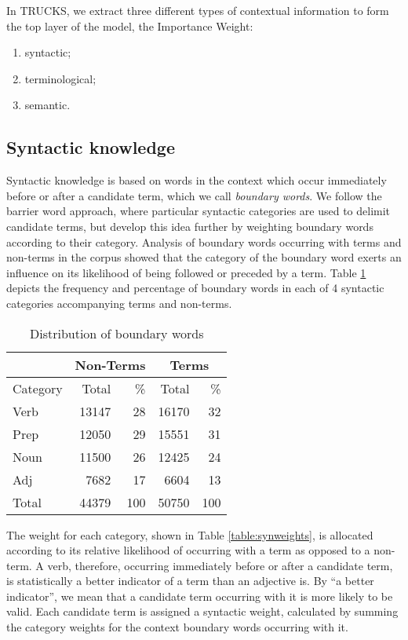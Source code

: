 In TRUCKS, we extract three different types of contextual information
to form the top layer of the model, the Importance Weight:
\begin{enumerate}
\item syntactic;
\item terminological;
\item semantic.
\end{enumerate}

\subsection{Syntactic knowledge}
Syntactic knowledge is based on words
in the context which occur immediately before or after a candidate
term, which we call {\it boundary words}. We follow the barrier
word approach,
where particular syntactic categories are used to delimit candidate
terms, but develop this idea further by weighting boundary words
according to their category. Analysis of boundary words occurring with
terms and non-terms in the corpus showed that the category of the
boundary word exerts an influence on its likelihood of being followed or
preceded by a term. Table \ref{table:syndistrib} depicts the frequency and
percentage of boundary words in each of 4 syntactic categories accompanying terms
and non-terms. 

\begin{table}
\begin{center}
\begin{tabular}{|l|r|r|r|r|}
\hline
 & \multicolumn{2}{|c|}{Non-Terms} & \multicolumn{2}{c|}{Terms}\\
\hline
Category & Total & \% & Total & \%\\
\hline
Verb & 13147 & 28 & 16170 & 32\\ 
Prep & 12050 & 29 & 15551 & 31\\ 
Noun & 11500 & 26 & 12425 & 24\\
Adj  & 7682  & 17 & 6604  & 13\\
\hline
Total & 44379 & 100 & 50750 & 100\\
\hline
\end{tabular}
\end{center}
\caption{Distribution of boundary words}
\label{table:syndistrib}
\end{table}

The weight for each category, shown in
Table \ref{table:synweights}, is allocated according to its relative
likelihood of occurring with a term as opposed to a non-term. A verb,
therefore, occurring immediately before or after a candidate term, is
statistically a better indicator of a term than an adjective is. By
``a better indicator'', we mean that a candidate term occurring with
it is more likely to be valid. Each candidate term is assigned a
syntactic weight, calculated by summing the category weights for the context
boundary words occurring with it.

